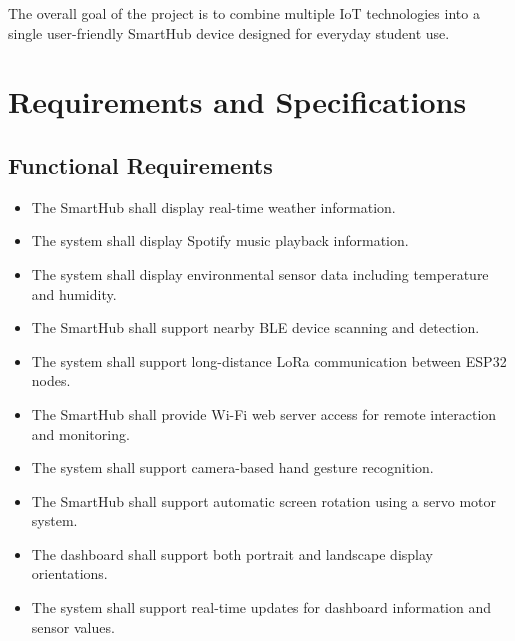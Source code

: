 \documentclass[11pt,letterpaper]{article}
\begin{document}
The overall goal of the project is to combine multiple IoT
technologies into a single user-friendly SmartHub device designed for
everyday student use.

\section{Requirements and Specifications}

\subsection{Functional Requirements}
\begin{itemize}[leftmargin=*]
    \item The SmartHub shall display real-time weather information.
    \item The system shall display Spotify music playback information.
    \item The system shall display environmental sensor data including
          temperature and humidity.
    \item The SmartHub shall support nearby BLE device scanning and
          detection.
    \item The system shall support long-distance LoRa communication
          between ESP32 nodes.
    \item The SmartHub shall provide Wi-Fi web server access for
          remote interaction and monitoring.
    \item The system shall support camera-based hand gesture
          recognition.
    \item The SmartHub shall support automatic screen rotation using a
          servo motor system.
    \item The dashboard shall support both portrait and landscape
          display orientations.
    \item The system shall support real-time updates for dashboard
          information and sensor values.
\end{itemize}
\end{document}
